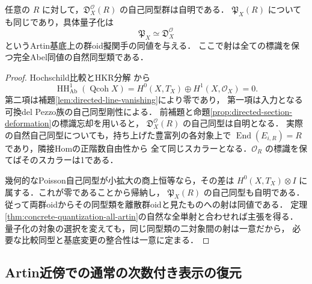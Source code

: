 \begin{theorem}[framed群oidにおける具体量子化の完全性]
\label{thm:quantization-framed-groupoid}
任意の $R$ に対して，$\mathfrak D_X^{\mathcal O}(R)$ の自己同型群は自明である．
$\mathfrak P_X(R)$ についても同じであり，具体量子化は
\[
 \mathfrak P_X\simeq\mathfrak D_X^{\mathcal O}
\]
というArtin基底上の群oid擬関手の同値を与える．
ここで射は全ての標識を保つ完全Abel同値の自然同型類である．
\end{theorem}
\begin{proof}
Hochschild比較とHKR分解
\cite[Theorem~6.6, Corollaries~7.7.2,7.8.2]{LowenVdBHochschild}
\cite[Corollary~0.6]{YekutieliHKR2002}から
\[
 \operatorname{HH}^1_{\mathrm{Ab}}(\operatorname{Qcoh}X)
 =H^0(X,T_X)\oplus H^1(X,\mathcal O_X)=0.
\]
第二項は補題\ref{lem:directed-line-vanishing}により零であり，
第一項は入力となる可換del Pezzo族の自己同型剛性による．
前補題と命題\ref{prop:directed-section-deformation}の標識忘却を用いると，
$\mathfrak D_X^{\mathcal O}(R)$ の自己同型は自明となる．
実際の自然自己同型についても，持ち上げた豊富列の各対象上で
$\operatorname{End}(E_{i,R})=R$ であり，隣接Homの正階数自由性から
全て同じスカラーとなる．$\mathcal O_R$ の標識を保てばそのスカラーは1である．

幾何的なPoisson自己同型が小拡大の商上恒等なら，その差は
$H^0(X,T_X)\otimes I$ に属する．これが零であることから帰納し，
$\mathfrak P_X(R)$ の自己同型も自明である．
従って両群oidからその同型類を離散群oidと見たものへの射は同値である．
定理\ref{thm:concrete-quantization-all-artin}の自然な全単射と合わせれば主張を得る．
量子化の対象の選択を変えても，同じ同型類の二対象間の射は一意だから，
必要な比較同型と基底変更の整合性は一意に定まる．
\end{proof}

\subsection{Artin近傍での通常の次数付き表示の復元}

